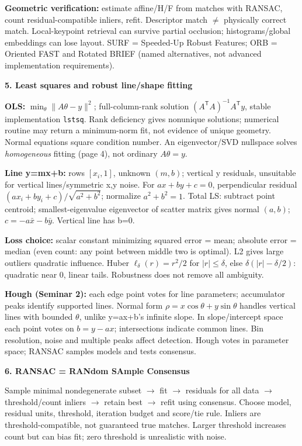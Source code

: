 \documentclass[a4paper]{article}
\newcommand{\key}[1]{\textbf{#1}}
\newcommand{\Topic}[1]{\par\vspace{1.7pt}\noindent
  {\fontsize{7.7}{8.0}\selectfont\bfseries #1}\par\vspace{0.3pt}}
\newcommand{\norm}[1]{\lVert #1\rVert}
\newcommand{\trans}{^{\mathsf T}}
\newcommand{\inv}{^{-1}}
\newcounter{sheet}
\newcounter{sheetcolumn}
\newlength{\colwidth}
\newenvironment{sheetcol}[1][7.0]{\stepcounter{sheetcolumn}
  \begin{lrbox}{\columnbox}\begin{minipage}[t]{\colwidth}\vspace{0pt}
  \fontsize{#1}{\dimexpr#1pt+0.6pt\relax}\selectfont}
  {\end{minipage}\end{lrbox}
  \typeout{CV1COL|\thesheet|\thesheetcolumn|\the\dimexpr\ht\columnbox+\dp\columnbox\relax}
  \usebox{\columnbox}\ignorespacesafterend}
\begin{document}
\begin{sheetcol}[6.5]
\key{Geometric verification:} estimate affine/H/F from matches with RANSAC, count residual-compatible inliers, refit. Descriptor match \(\ne\) physically correct match. Local-keypoint retrieval can survive partial occlusion; histograms/global embeddings can lose layout. SURF = Speeded-Up Robust Features; ORB = Oriented FAST and Rotated BRIEF (named alternatives, not advanced implementation requirements).

\Topic{5. Least squares and robust line/shape fitting}
\key{OLS:} \(\min_\theta\norm{A\theta-y}^2\); full-column-rank solution \((A\trans A)\inv A\trans y\), stable implementation \texttt{lstsq}. Rank deficiency gives nonunique solutions; numerical routine may return a minimum-norm fit, not evidence of unique geometry. Normal equations square condition number. An eigenvector/SVD nullspace solves \emph{homogeneous} fitting (page 4), not ordinary \(A\theta=y\).

\key{Line y=mx+b:} rows \([x_i,1]\), unknown \((m,b)\); vertical y residuals, unsuitable for vertical lines/symmetric x,y noise. For \(ax+by+c=0\), perpendicular residual \((ax_i+by_i+c)/\sqrt{a^2+b^2}\); normalize \(a^2+b^2=1\). Total LS: subtract point centroid; smallest-eigenvalue eigenvector of scatter matrix gives normal \((a,b)\); \(c=-a\bar x-b\bar y\). Vertical line has b=0.

\key{Loss choice:} scalar constant minimizing squared error = mean; absolute error = median (even count: any point between middle two is optimal). L2 gives large outliers quadratic influence. Huber \(\ell_\delta(r)=r^2/2\) for \(|r|\le\delta\), else \(\delta(|r|-\delta/2)\): quadratic near 0, linear tails. Robustness does not remove all ambiguity.

\key{Hough (Seminar 2):} each edge point votes for line parameters; accumulator peaks identify supported lines. Normal form \(\rho=x\cos\theta+y\sin\theta\) handles vertical lines with bounded \(\theta\), unlike y=ax+b's infinite slope. In slope/intercept space each point votes on \(b=y-ax\); intersections indicate common lines. Bin resolution, noise and multiple peaks affect detection. Hough votes in parameter space; RANSAC samples models and tests consensus.

\Topic{6. RANSAC = RANdom SAmple Consensus}
Sample minimal nondegenerate subset \(\to\) fit \(\to\) residuals for all data \(\to\) threshold/count inliers \(\to\) retain best \(\to\) refit using consensus. Choose model, residual units, threshold, iteration budget and score/tie rule. Inliers are threshold-compatible, not guaranteed true matches. Larger threshold increases count but can bias fit; zero threshold is unrealistic with noise.


\end{sheetcol}
\end{document}
